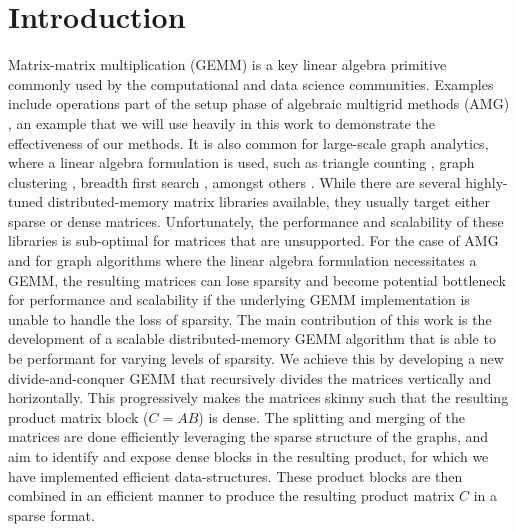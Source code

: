 \section{Introduction}
\label{sec:intro}


Matrix-matrix multiplication (\textsc{GEMM}) is a key linear algebra primitive commonly used by the computational and data science communities. Examples include operations part of the setup phase of algebraic multigrid methods (AMG) \cite{Dendy82}, an example that we will use heavily in this work to demonstrate the effectiveness of our methods. It is also common for large-scale graph analytics, where a linear algebra formulation is used, such as triangle counting \cite{azad2015parallel}, graph clustering \cite{van2000graph}, breadth first search \cite{gilbert2008unified}, amongst others \cite{kepner2011graph}. 
While there are several highly-tuned distributed-memory matrix libraries available, they usually target either sparse \cite{petsc-web-page, combblas} or dense \cite{ElemNewFrame} matrices. Unfortunately, the performance and scalability of these libraries is sub-optimal for matrices that are unsupported. For the case of AMG and for graph algorithms where the linear algebra formulation necessitates a \textsc{GEMM}, the resulting matrices can lose sparsity and become potential bottleneck for performance and scalability if the underlying \textsc{GEMM} implementation is unable to handle the loss of sparsity. The main contribution of this work is the development of a scalable distributed-memory \textsc{GEMM} algorithm that is able to be performant for varying levels of sparsity.
We achieve this by developing a new divide-and-conquer \textsc{GEMM} that recursively divides the matrices vertically and horizontally. This progressively makes the matrices skinny such that the resulting product matrix block ($C = AB$) is dense. The splitting and merging of the matrices are done efficiently leveraging the sparse structure of the graphs, and aim to identify and expose dense blocks in the resulting product, for which we have implemented efficient data-structures. These product blocks are then combined in an efficient manner to produce the resulting product matrix $C$ in a sparse format. 

